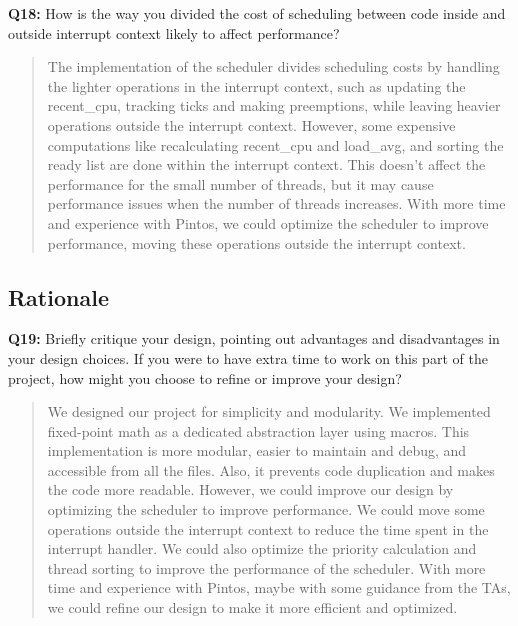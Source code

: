 \documentclass[a4paper,11pt]{paper}
\begin{document}
\textbf{Q18:} How is the way you divided the cost of scheduling between code inside and outside interrupt context likely to affect performance?
\begin{quote}
The implementation of the scheduler divides scheduling costs by handling the
lighter operations in the interrupt context, such as updating the recent\_cpu,
	tracking ticks and making preemptions, while leaving heavier operations
	outside the interrupt context. However, some expensive computations like
	recalculating recent\_cpu and load\_avg, and sorting the ready list are done
	within the interrupt context. This doesn't affect the performance for the
	small number of threads, but it may cause performance issues when the
	number of threads increases. With more time and experience with Pintos,
	we could optimize the scheduler to improve performance, moving these operations
	outside the interrupt context.
\end{quote}

\subsection{Rationale}

\textbf{Q19:} Briefly critique your design, pointing out advantages and disadvantages in your design choices.  If you were to have extra time to work on this part of the project, how might you choose to refine or improve your design?
\begin{quote}
  We designed our project for simplicity and modularity. We implemented
	fixed-point math as a dedicated abstraction layer using macros. This
	implementation is more modular, easier to maintain and debug, and
	accessible from all the files. Also, it prevents code duplication and makes
	the code more readable. However, we could improve our design by
	optimizing the scheduler to improve performance. We could move some
	operations outside the interrupt context to reduce the time spent in the
	interrupt handler. We could also optimize the priority calculation and
	thread sorting to improve the performance of the scheduler.
	With more time and experience with Pintos, maybe with some guidance
	from the TAs, we could refine our design to make it more efficient and
	optimized.
\end{quote}
\end{document}
